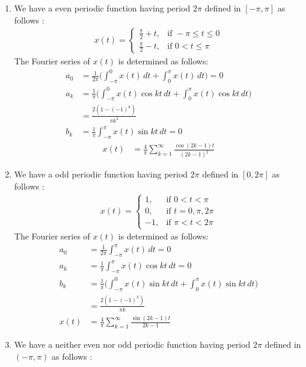 \documentclass[journal,12pt,twocolumn]{IEEEtran}
\begin{document}
\begin{enumerate}
\item We have a even periodic function having period $2\pi$ defined in $[-\pi,\pi]$ as follows :
\begin{align}
x(t)=  
\begin{cases}
\frac{\pi}{2}+t, & \text{if } -\pi \leq t \leq 0\\
\frac{\pi}{2}-t, & \text{if } 0 < t \leq \pi \nonumber
\end{cases}
\end{align}
The Fourier series of $x(t)$ is determined as follows:
\begin{align}
a_{0} &=\frac{1}{2\pi}\Bigg({\int_{-\pi}^{0}x(t)\, dt}+{\int_{0}^{\pi}x(t)\, dt}\Bigg)=0 \nonumber \\
a_{k} &= \frac{1}{\pi}\Bigg({\int_{-\pi}^{0}x(t)\cos{kt}\, dt}+{\int_{0}^{\pi}x(t)\cos{kt}\, dt}\Bigg) \nonumber \\
&= \frac{2(1-(-1)^{k})}{\pi k^{2}}\nonumber \\
b_{k} &= \frac{1}{\pi}{\int_{-\pi}^{\pi}x(t)\sin{kt}\, dt} = 0\nonumber
\end{align}
\begin{align}
x(t) &= \frac{4}{\pi}\sum_{k=1}^{\infty}\frac{\cos{(2k-1)t}}{(2k-1)^{2}}
\end{align}
\item We have a odd periodic function having period $2\pi$ defined in $[0,2\pi]$ as follows :
\begin{align}
x(t)=  
\begin{cases}
1, & \text{if } 0 < t < \pi\\
0, & \text{if } t = 0,\pi,2\pi\\
-1, & \text{if } \pi < t < 2\pi \nonumber
\end{cases}
\end{align}
The Fourier series of $x(t)$ is determined as follows:
\begin{align}
a_{0} &=\frac{1}{2\pi}{\int_{-\pi}^{\pi}x(t)\, dt}=0 \nonumber \\
a_{k} &= \frac{1}{\pi}{\int_{-\pi}^{\pi}x(t)\cos{kt}\, dt} = 0\nonumber \\
b_{k} &= \frac{1}{\pi}\Bigg({\int_{-\pi}^{0}x(t)\sin{kt}\, dt}+{\int_{0}^{\pi}x(t)\sin{kt}\, dt}\Bigg) \nonumber \\
&= \frac{2(1-(-1)^{k})}{\pi k}\nonumber \\
x(t) &= \frac{4}{\pi}\sum_{k=1}^{\infty}\frac{\sin{(2k-1)t}}{2k-1}
\end{align}
\item We have a neither even nor odd periodic function having period $2\pi$ defined in $(-\pi,\pi)$ as follows :

\end{enumerate}
\end{document}
